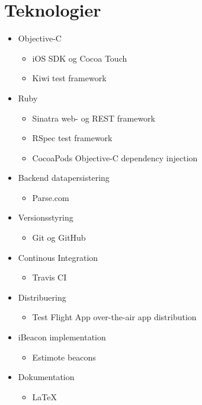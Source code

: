 \chapter{Teknologier}
\label{ch:teknologier}
\begin{itemize}
\item Objective-C
\begin{itemize}
\item iOS SDK og Cocoa Touch
\item Kiwi test framework
\end{itemize}
\item Ruby
\begin{itemize}
\item Sinatra web- og REST framework
\item RSpec test framework
\item CocoaPods Objective-C dependency injection
\end{itemize}
\item Backend datapersistering
\begin{itemize}
\item Parse.com
\end{itemize}
\item Versionsstyring
\begin{itemize}
\item Git og GitHub
\end{itemize}
\item Continous Integration
\begin{itemize}
\item Travis CI
\end{itemize}
\item Distribuering
\begin{itemize}
\item Test Flight App over-the-air app distribution
\end{itemize}
\item iBeacon implementation
\begin{itemize}
\item Estimote beacons
\end{itemize}
\item Dokumentation
\begin{itemize}
\item{LaTeX}
\end{itemize}
\end{itemize}